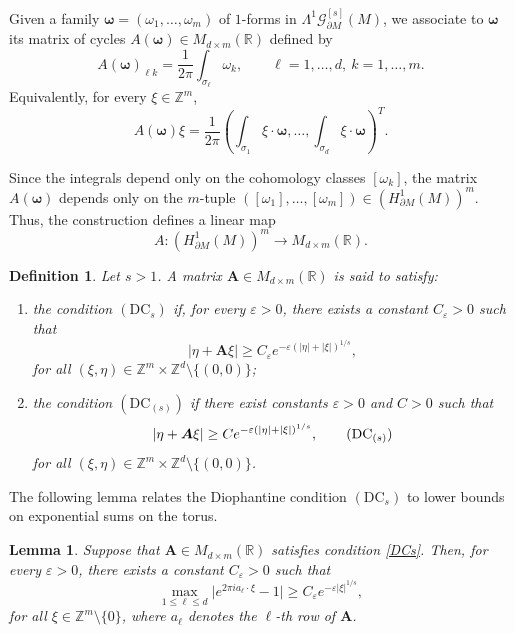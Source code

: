 \documentclass[11pt,reqno]{amsart}
\numberwithin{equation}{section}
\newtheorem{definition}[theorem]{Definition}
\newtheorem{lemma}[theorem]{Lemma}
\begin{document}
	Given a family $\boldsymbol{\omega}=(\omega_1,\dots,\omega_m)$ of $1$-forms in 
	$\mathsf{\Lambda}^1\mathscr{G}^{[s]}_{\partial M}(M)$, we associate to $\boldsymbol{\omega}$
	its matrix of cycles $A(\boldsymbol{\omega}) \in M_{d\times m}(\mathbb{R})$ defined by
	\[
	A(\boldsymbol{\omega})_{\ell k} = \frac{1}{2\pi}\int_{\sigma_\ell}\omega_k, \qquad 	\ell=1,\dots,d,\ k=1,\dots,m.
	\]
	Equivalently, for every $\xi\in\mathbb{Z}^m$,
	\[
	A(\boldsymbol{\omega})\xi = \frac{1}{2\pi} 
	\left( \int_{\sigma_1}\xi\cdot\boldsymbol{\omega}, \dots, 	\int_{\sigma_d} \xi \cdot \boldsymbol{\omega}  \right)^T.
	\]
	
	Since the integrals depend only on the cohomology classes $[\omega_k]$,
	the matrix $A(\boldsymbol{\omega})$ depends only on the $m$-tuple
	$([\omega_1],\dots,[\omega_m]) \in (H^1_{\partial M}(M))^m$.
	Thus, the construction defines a linear map
	\[
	A : (H^1_{\partial M}(M))^m \longrightarrow M_{d\times m}(\mathbb{R}).
	\]
	
	\begin{definition}
		Let $s>1$. A matrix $\boldsymbol{A}\in M_{d\times m}(\mathbb{R})$
		is said to satisfy:
		\begin{enumerate}
			\item the condition $(\mathrm{DC}_s)$ if, for every $\varepsilon>0$,
			there exists a constant $C_\varepsilon>0$ such that
			\begin{equation}\label{DCs}
				|\eta+\boldsymbol{A}\xi|
				\geq
				C_\varepsilon
				e^{-\varepsilon (|\eta|+|\xi|)^{1/s}},
				\tag{DC$_s$}
			\end{equation}
			for all $(\xi,\eta)\in
			\mathbb{Z}^m\times\mathbb{Z}^d\setminus\{(0,0)\}$;
			
			\item the condition $(\mathrm{DC}_{(s)})$ if there exist constants
			$\varepsilon>0$ and $C>0$ such that
			\begin{equation}\label{DCss}
				|\eta+\boldsymbol{A}\xi|
				\geq
				C
				e^{-\varepsilon (|\eta|+|\xi|)^{1/s}},
				\tag{DC$_{(s)}$}
			\end{equation}
			for all $(\xi,\eta)\in
			\mathbb{Z}^m\times\mathbb{Z}^d\setminus\{(0,0)\}$.
		\end{enumerate}
	\end{definition}
	
	
	The following lemma relates the Diophantine condition $(\mathrm{DC}_s)$ to lower bounds on exponential sums on the torus.
	
	\begin{lemma}\label{est_DCs}
		Suppose that $\boldsymbol{A}\in M_{d\times m}(\mathbb{R})$ satisfies condition \eqref{DCs}. Then, for every $\varepsilon>0$, there exists a constant $C_\varepsilon>0$ such that
		\[
		\max_{1\leq \ell \leq d}
		\big|e^{2\pi i a_\ell\cdot \xi}-1\big|
		\geq
		C_\varepsilon
		e^{-\varepsilon |\xi|^{1/s}},
		\]
		for all $\xi\in\mathbb{Z}^m\setminus\{0\}$,
		where $a_\ell$ denotes the $\ell$-th row of $\boldsymbol{A}$.
	\end{lemma}
	
\end{document}
